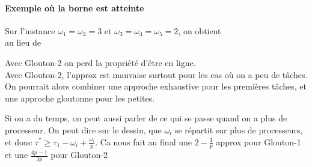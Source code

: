 \paragraph{Exemple où la borne est atteinte}
Sur l'instance $\omega_1 = \omega_2 = 3$ et $\omega_3 = \omega_4 = \omega_5 = 2$, on obtient\\
	 au lieu de 


\begin{rem}
	Avec Glouton-2 on perd la propriété d'être en ligne. \\
	Avec Glouton-2, l'approx est mauvaise surtout pour les cas où on a peu de tâches. On pourrait alors combiner une approche exhaustive pour les premières tâches, et une approche gloutonne pour les petites.
\end{rem}

\begin{com}
	Si on a du temps, on peut aussi parler de ce qui se passe quand on a plus de processeur. On peut dire sur le dessin, que $\omega_i$ se répartit sur plus de processeurs, et donc $\tau^* \geq \tau_1 - \omega_i + \frac{\omega_i}{p}$. Ca nous fait au final une $2-\frac{1}{p}$ approx pour Glouton-1 et une $\frac{4p-1}{3p}$ pour Glouton-2
\end{com}